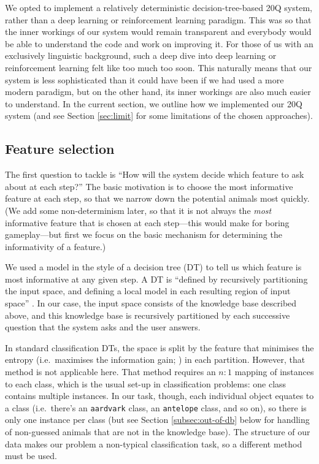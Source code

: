 \documentclass[11pt,a4paper]{article}
\begin{document}
We opted to implement a relatively deterministic decision-tree-based 20Q system, rather than a deep learning or reinforcement learning paradigm.
This was so that the inner workings of our system would remain transparent and everybody would be able to understand the code and work on improving it.
For those of us with an exclusively linguistic background, such a deep dive into deep learning or reinforcement learning felt like too much too soon.
This naturally means that our system is less sophisticated than it could have been if we had used a more modern paradigm, but on the other hand, its inner workings are also much easier to understand.
In the current section, we outline how we implemented our 20Q system (and see Section \ref{sec:limit} for some limitations of the chosen approaches).

\subsection{Feature selection}
\label{subsec:featselec}

The first question to tackle is ``How will the system decide which feature to ask about at each step?''
The basic motivation is to choose the most informative feature at each step, so that we narrow down the potential animals most quickly.
(We add some non-determinism later, so that it is not always the \textit{most} informative feature that is chosen at each step---this would make for boring gameplay---but first we focus on the basic mechanism for determining the informativity of a feature.)

We used a model in the style of a decision tree (DT) to tell us which feature is most informative at any given step.
A DT is ``defined by recursively partitioning the input space, and defining a local model in each resulting region of input space'' \citep[545]{Murphy2012}.
In our case, the input space consists of the knowledge base described above, and this knowledge base is recursively partitioned by each successive question that the system asks and the user answers.

In standard classification DTs, the space is split by the feature that minimises the entropy (i.e.\ maximises the information gain; \citealt{Quinlan1986}) in each partition.
However, that method is not applicable here.
That method requires an $n : 1$ mapping of instances to each class, which is the usual set-up in classification problems: one class contains multiple instances.
In our task, though, each individual object equates to a class (i.e.\ there's an \texttt{aardvark} class, an \texttt{antelope} class, and so on), so there is only one instance per class (but see Section \ref{subsec:out-of-db} below for handling of non-guessed animals that are not in the knowledge base).
The structure of our data makes our problem a non-typical classification task, so a different method must be used.
\end{document}
